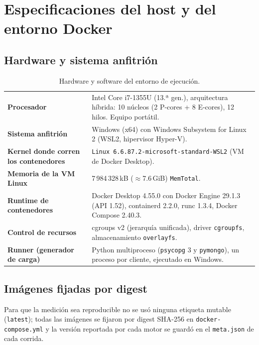 \documentclass[11pt,a4paper]{article}
\begin{document}
\newpage
\tableofcontents
\listoftables
\listoffigures
\newpage

\section{Especificaciones del host y del entorno Docker}\label{sec:host}

\subsection{Hardware y sistema anfitrión}

\begin{table}[H]
\centering\small
\caption{Hardware y software del entorno de ejecución.}\label{tab:host}
\begin{tabular}{>{\bfseries}p{4.2cm}p{11cm}}
\toprule
Procesador & Intel Core i7-1355U (13.ª gen.), arquitectura híbrida: 10 núcleos (2 P-cores + 8 E-cores), 12 hilos. Equipo portátil. \\
Sistema anfitrión & Windows (x64) con Windows Subsystem for Linux 2 (WSL2, hipervisor Hyper-V). \\
Kernel donde corren los contenedores & \texttt{Linux 6.6.87.2-microsoft-standard-WSL2} (VM de Docker Desktop). \\
Memoria de la VM Linux & 7\,984\,328\,kB ($\approx$7.6\,GiB) \texttt{MemTotal}. \\
Runtime de contenedores & Docker Desktop 4.55.0 con Docker Engine 29.1.3 (API 1.52), containerd 2.2.0, runc 1.3.4, Docker Compose 2.40.3. \\
Control de recursos & cgroups v2 (jerarquía unificada), driver \texttt{cgroupfs}, almacenamiento \texttt{overlayfs}. \\
Runner (generador de carga) & Python multiproceso (\texttt{psycopg} 3 y \texttt{pymongo}), un proceso por cliente, ejecutado en Windows. \\
\bottomrule
\end{tabular}
\end{table}

\subsection{Imágenes fijadas por digest}

Para que la medición sea reproducible no se usó ninguna etiqueta mutable (\texttt{latest}); todas las imágenes se fijaron por digest SHA-256 en \texttt{docker-compose.yml} y la versión reportada por cada motor se guardó en el \texttt{meta.json} de cada corrida.
\end{document}
